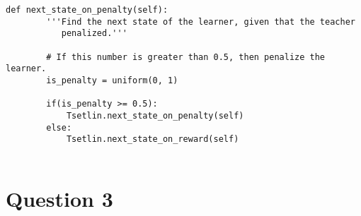 \documentclass[10pt,english]{article}
\begin{document}
\clearpage
\begin{lstlisting}[label={list:first},caption=Krylov core code.] 
def next_state_on_penalty(self):
        '''Find the next state of the learner, given that the teacher
           penalized.'''

        # If this number is greater than 0.5, then penalize the learner.
        is_penalty = uniform(0, 1)

        if(is_penalty >= 0.5):
            Tsetlin.next_state_on_penalty(self)
        else:
            Tsetlin.next_state_on_reward(self)
   
\end{lstlisting}

\section{Question 3}
\end{document}
